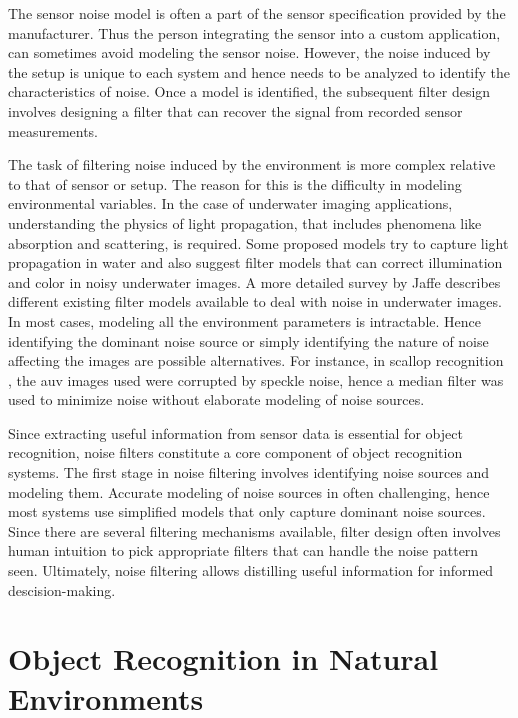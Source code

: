 \documentclass {udthesis}
\begin{document}
The sensor noise model is often a part of the sensor specification provided by the manufacturer. 
Thus the person integrating the sensor into a custom application, can sometimes avoid modeling the sensor noise. 
However, the noise induced by the setup is unique to each system and hence needs to be analyzed to identify the characteristics of noise.
Once a model is identified, the subsequent filter design involves designing a filter that can recover the signal from recorded sensor measurements.

The task of filtering noise induced by the environment is more complex relative to that
of sensor or setup.
The reason for this is the difficulty in modeling environmental variables. 
In the case of underwater imaging applications, understanding the physics of 
light propagation, that includes phenomena like absorption and scattering, is required. Some proposed models \cite{garcia, ahlen} try to 
capture light propagation in water and also suggest filter models that can correct illumination and color in noisy underwater images. A more detailed survey
by Jaffe \cite{jaffe} describes different existing filter models available to deal with noise in underwater images.
In most cases, modeling all the environment parameters is intractable. Hence identifying the dominant noise source or simply identifying the nature of noise affecting the images are possible alternatives.
For instance, in scallop recognition \cite{prasanna_aslo}, the \gls{auv} images used were corrupted by speckle noise, hence a median filter \cite{despeckle} was used to minimize noise without elaborate modeling of noise sources.

Since extracting useful information from sensor data is essential for object recognition, noise filters constitute a core component of object recognition systems. The first stage in noise filtering involves identifying noise sources and modeling them. Accurate modeling of noise sources in often challenging, hence most systems use simplified models that only capture dominant noise sources. Since there are several filtering mechanisms available, filter design often involves human intuition to pick appropriate filters that can handle the noise pattern seen. Ultimately, noise filtering allows distilling useful information for informed descision-making.

\section{Object Recognition in Natural Environments}
\end{document}
